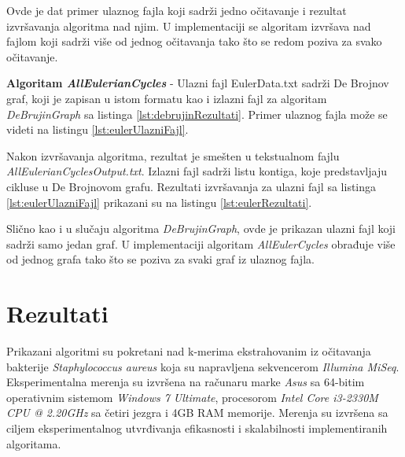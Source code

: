 \documentclass[12pt,oneside]{memoir}
\begin{document}


Ovde je dat primer ulaznog fajla koji sadrži jedno očitavanje i rezultat izvršavanja algoritma nad njim. U implementaciji se algoritam izvršava nad fajlom koji sadrži više od jednog očitavanja tako što se redom poziva za svako očitavanje.

\textbf{Algoritam \textit{AllEulerianCycles}} - Ulazni fajl EulerData.txt sadrži De Brojnov
graf, koji je zapisan u istom formatu kao i izlazni fajl za algoritam \textit{DeBrujinGraph} sa listinga \ref{lst:debrujinRezultati}.  Primer ulaznog fajla može se videti na listingu \ref{lst:eulerUlazniFajl}.



Nakon izvršavanja algoritma, rezultat je smešten u tekstualnom fajlu \textit{AllEulerianCyclesOutput.txt}. Izlazni fajl sadrži listu kontiga, koje predstavljaju cikluse u De Brojnovom grafu. Rezultati izvršavanja za ulazni fajl sa listinga \ref{lst:eulerUlazniFajl} prikazani su na listingu \ref{lst:eulerRezultati}.



Slično kao i u slučaju algoritma \textit{DeBrujinGraph}, ovde je prikazan ulazni fajl koji sadrži samo jedan graf. U implementaciji algoritam \textit{AllEulerCycles} obrađuje više od jednog grafa tako što se poziva za svaki graf iz ulaznog fajla.

\section{Rezultati}
\label{odeljak:Rezultati}

Prikazani algoritmi su pokretani nad k-merima ekstrahovanim iz očitavanja bakterije \textit{Staphylococcus aureus} koja su napravljena sekvencerom \textit{Illumina MiSeq}. Eksperimentalna merenja su izvršena na računaru marke \textit{Asus} sa 64-bitim operativnim sistemom \textit{Windows 7 Ultimate}, procesorom \textit{Intel Core i3-2330M CPU @ 2.20GHz} sa četiri jezgra i 4GB RAM memorije. Merenja su izvršena sa ciljem eksperimentalnog utvrđivanja efikasnosti i skalabilnosti implementiranih algoritama.
\end{document}
